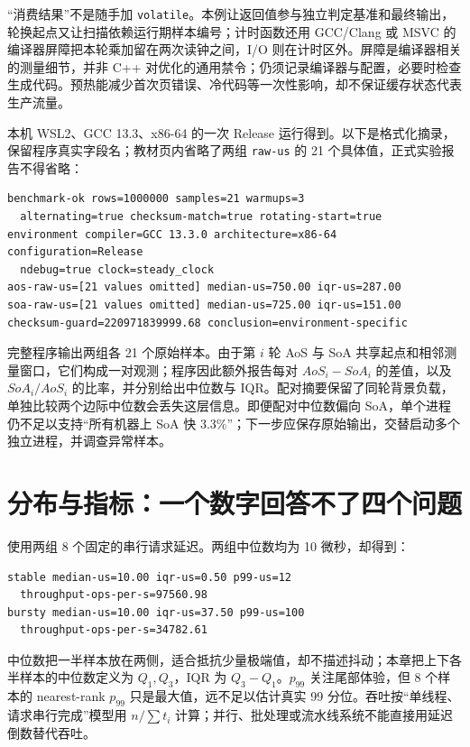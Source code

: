 “消费结果”不是随手加 \texttt{volatile}。本例让返回值参与独立判定基准和最终输出，轮换起点又让扫描依赖运行期样本编号；计时函数还用 GCC/Clang 或 MSVC 的编译器屏障把本轮乘加留在两次读钟之间，I/O 则在计时区外。屏障是编译器相关的测量细节，并非 C++ 对优化的通用禁令；仍须记录编译器与配置，必要时检查生成代码。预热能减少首次页错误、冷代码等一次性影响，却不保证缓存状态代表生产流量。

本机 WSL2、GCC 13.3、x86-64 的一次 Release 运行得到。以下是格式化摘录，保留程序真实字段名；教材页内省略了两组 \texttt{raw-us} 的 21 个具体值，正式实验报告不得省略：

\begin{lstlisting}[numbers=none]
benchmark-ok rows=1000000 samples=21 warmups=3
  alternating=true checksum-match=true rotating-start=true
environment compiler=GCC 13.3.0 architecture=x86-64 configuration=Release
  ndebug=true clock=steady_clock
aos-raw-us=[21 values omitted] median-us=750.00 iqr-us=287.00
soa-raw-us=[21 values omitted] median-us=725.00 iqr-us=151.00
checksum-guard=220971839999.68 conclusion=environment-specific
\end{lstlisting}

完整程序输出两组各 21 个原始样本。由于第 \(i\) 轮 AoS 与 SoA 共享起点和相邻测量窗口，它们构成一对观测；程序因此额外报告每对 \(AoS_i-SoA_i\) 的差值，以及 \(SoA_i/AoS_i\) 的比率，并分别给出中位数与 IQR。配对摘要保留了同轮背景负载，单独比较两个边际中位数会丢失这层信息。即便配对中位数偏向 SoA，单个进程仍不足以支持“所有机器上 SoA 快 3.3\%”；下一步应保存原始输出，交替启动多个独立进程，并调查异常样本。

\section{分布与指标：一个数字回答不了四个问题}

 使用两组 8 个固定的串行请求延迟。两组中位数均为 10 微秒，却得到：

\begin{lstlisting}[numbers=none]
stable median-us=10.00 iqr-us=0.50 p99-us=12
  throughput-ops-per-s=97560.98
bursty median-us=10.00 iqr-us=37.50 p99-us=100
  throughput-ops-per-s=34782.61
\end{lstlisting}

中位数把一半样本放在两侧，适合抵抗少量极端值，却不描述抖动；本章把上下各半样本的中位数定义为 $Q_1,Q_3$，IQR 为 $Q_3-Q_1$。$p_{99}$ 关注尾部体验，但 8 个样本的 nearest-rank $p_{99}$ 只是最大值，远不足以估计真实 99 分位。吞吐按“单线程、请求串行完成”模型用 $n/\sum t_i$ 计算；并行、批处理或流水线系统不能直接用延迟倒数替代吞吐。

